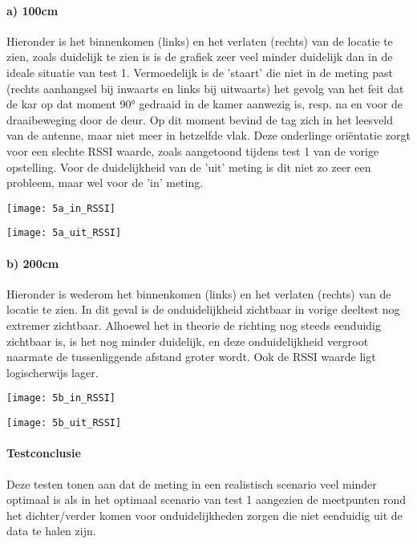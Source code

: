 \paragraph{a) 100cm}
Hieronder is het binnenkomen (links) en het verlaten (rechts) van de locatie te zien, zoals duidelijk te zien is is de grafiek zeer veel minder duidelijk dan in de ideale situatie van test 1. Vermoedelijk is de 'staart' die niet in de meting past (rechts aanhangsel bij inwaarts en links bij uitwaarts) het gevolg van het feit dat de kar op dat moment 90° gedraaid in de kamer aanwezig is, resp. na en voor de draaibeweging door de deur. Op dit moment bevind de tag zich in het leesveld van de antenne, maar niet meer in hetzelfde vlak. Deze onderlinge oriëntatie zorgt voor een slechte RSSI waarde, zoals aangetoond tijdens test 1 van de vorige opstelling. Voor de duidelijkheid van de 'uit' meting is dit niet zo zeer een probleem, maar wel voor de 'in' meting.

\begin{minipage}{0.42\textwidth}
	\texttt{[image: 5a\_in\_RSSI]}
\end{minipage}
\hfill
\begin{minipage}{0.42\textwidth}
	\texttt{[image: 5a\_uit\_RSSI]}
\end{minipage}

\paragraph{b) 200cm}
Hieronder is wederom het binnenkomen (links) en het verlaten (rechts) van de locatie te zien. In dit geval is de onduidelijkheid zichtbaar in vorige deeltest nog extremer zichtbaar. Alhoewel het in theorie de richting nog steeds eenduidig zichtbaar is, is het nog minder duidelijk, en deze onduidelijkheid vergroot naarmate de tussenliggende afstand groter wordt. Ook de RSSI waarde ligt logischerwijs lager.

\begin{minipage}{0.42\textwidth}
	\texttt{[image: 5b\_in\_RSSI]}
\end{minipage}
\hfill
\begin{minipage}{0.42\textwidth}
	\texttt{[image: 5b\_uit\_RSSI]}
\end{minipage}

\paragraph{Testconclusie}
Deze testen tonen aan dat de meting in een realistisch scenario veel minder optimaal is als in het optimaal scenario van test 1 aangezien de meetpunten rond het dichter/verder komen voor onduidelijkheden zorgen die niet eenduidig uit de data te halen zijn.

